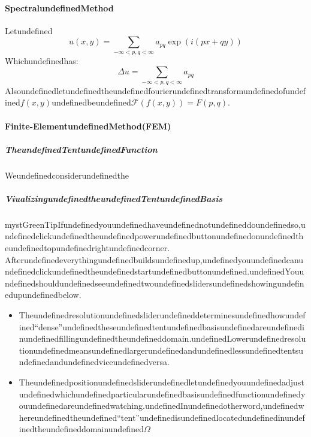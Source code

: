 \paragraph{SpectralundefinedMethod}

Letundefined
\begin{equation}
u(x,y)=\sum_{-\infty<p,q<\infty} a_{pq}  \exp(i(px +qy))
\end{equation}
Whichundefinedhas:
\begin{equation}
\Delta u = \sum_{-\infty<p,q<\infty} a_{pq}
\end{equation}
Alsoundefinedletundefinedtheundefinedfourierundefinedtransformundefinedofundefined$f(x,y)$undefinedbeundefined$\mathcal F (f(x,y))=F(p,q)$.

\paragraph{Finite-ElementundefinedMethod(FEM)}

\subparagraph{TheundefinedTentundefinedFunction}

Weundefinedconsiderundefinedthe

\subparagraph{ViualizingundefinedtheundefinedTentundefinedBasis}

\begin{mystadmonition}{mystGreen}{Tip}Ifundefinedyouundefinedhaveundefinednotundefineddoundefinedso,undefinedclickundefinedtheundefinedpowerundefinedbuttonundefinedonundefinedtheundefinedtopundefinedrightundefinedcorner.
Afterundefinedeverythingundefinedbuildsundefinedup,undefinedyouundefinedcanundefinedclickundefinedtheundefinedstartundefinedbuttonundefined.undefinedYouundefinedshouldundefinedseeundefinedtwoundefinedslidersundefinedshowingundefinedupundefinedbelow.

\begin{itemize}
\item Theundefinedresolutionundefinedsliderundefineddeterminesundefinedhowundefined``dense''undefinedtheseundefinedtentundefinedbasisundefinedareundefinedinundefinedfillingundefinedtheundefineddomain.undefinedLowerundefinedresolutionundefinedmeansundefinedlargerundefinedandundefinedlessundefinedtentsundefinedandundefinedviceundefinedversa.
\item Theundefinedpositionundefinedsliderundefinedletundefinedyouundefinedadjustundefinedwhichundefinedparticularundefinedbasisundefinedfunctionundefinedyouundefinedareundefinedwatching.undefinedInundefinedotherword,undefinedwhereundefinedtheundefined``tent''undefinedisundefinedlocatedundefinedinundefinedtheundefineddomainundefined$\Omega$
\end{itemize}

\end{mystadmonition}

